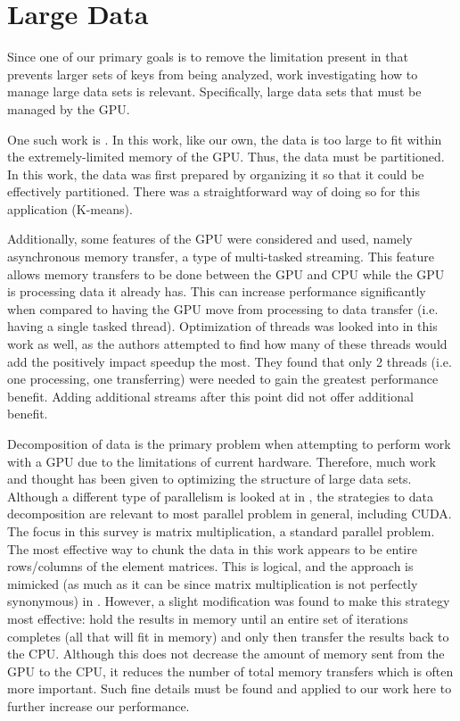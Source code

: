 \documentclass[12pt]{ucthesis}
\begin{document}
\section{Large Data}
Since one of our primary goals is to remove the limitation present in
\cite{scharfglass2012breaking} that prevents larger sets of keys from being
analyzed, work investigating how to manage large data sets is relevant.
Specifically, large data sets that must be managed by the GPU.

One such work is \cite{wu2009clustering}. In this work, like our own, the data
is too large to fit within the extremely-limited memory of the GPU. Thus, the
data must be partitioned. In this work, the data was first prepared by
organizing it so that it could be effectively partitioned. There was a
straightforward way of doing so for this application (K-means).

Additionally, some features of the GPU were considered and used, namely
asynchronous memory transfer, a type of multi-tasked streaming. This feature
allows memory transfers to be done between the GPU and CPU while the GPU is
processing data it already has. This can increase performance significantly
when compared to having the GPU move from processing to data transfer (i.e.
having a single tasked thread). Optimization of threads was looked into in this
work as well, as the authors attempted to find how many of these threads would
add the positively impact speedup the most. They found that only 2 threads
(i.e. one processing, one transferring) were needed to gain the greatest
performance benefit. Adding additional streams after this point did not offer
additional benefit.

Decomposition of data is the primary problem when attempting to perform work
with a GPU due to the limitations of current hardware. Therefore, much work and
thought has been given to optimizing the structure of large data sets. Although
a different type of parallelism is looked at in \cite{charles2012chunking}, the
strategies to data decomposition are relevant to most parallel problem in
general, including CUDA. The focus in this survey is matrix multiplication,
a standard parallel problem. The most effective way to chunk the data in this
work appears to be entire rows/columns of the element matrices. This is logical,
and the approach is mimicked (as much as it can be since matrix multiplication
is not perfectly synonymous) in \cite{scharfglass2012breaking}. However, a slight
modification was found to make this strategy most effective: hold the results
in memory until an entire set of iterations completes (all that will fit in
memory) and only then transfer the results back to the CPU. Although this does
not decrease the amount of memory sent from the GPU to the CPU, it reduces the
number of total memory transfers which is often more important. Such fine
details must be found and applied to our work here to further increase our
performance.
\end{document}
